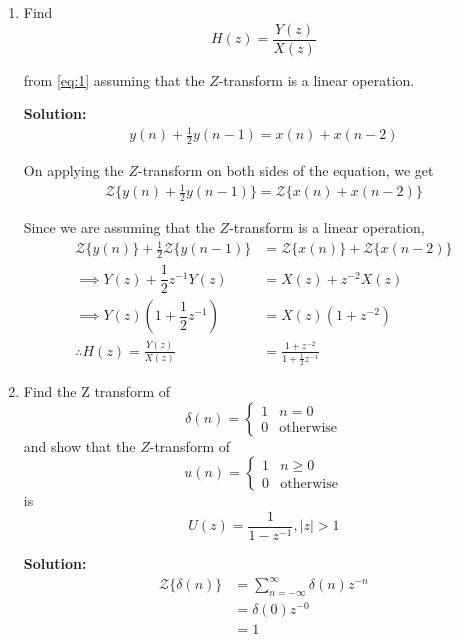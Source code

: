 \documentclass[journal,12pt,twocolumn]{IEEEtran}
\newcommand{\solution}{\noindent \textbf{Solution: }}
\providecommand{\brak}[1]{\ensuremath{\left(#1\right)}}
\providecommand{\abs}[1]{\left\vert#1\right\vert}
\providecommand{\z}[1]{{\mathcal{Z}}\{#1\}}
\numberwithin{equation}{section}
\renewcommand\thesection{\arabic{section}}
\begin{document}
\begin{enumerate}[label=\thesection.\arabic*]
	\item Find
	\begin{equation}
		H(z) = \frac{Y(z)}{X(z)}
	\end{equation}

	from  \eqref{eq:1} assuming that the $Z$-transform is a linear operation.

	\solution 
	\begin{align}
		y(n) + \frac{1}{2}y(n-1) = x(n) + x(n-2)
	\end{align}
	
	On applying the $Z$-transform on both sides of the equation, we get
	\begin{align}
		\z{y\brak{n} + \frac{1}{2}y\brak{n-1}} = \z{x\brak{n} + x\brak{n-2}}
	\end{align}
	
	Since we are assuming that the $Z$-transform is a linear operation,
	\begin{align}
		\z{y(n)} + \frac12 \z{y(n-1)} &= \z{x(n)} + \z{x(n-2)} \\
		\implies Y(z) + \dfrac{1}{2} z^{-1} Y(z) &= X(z) + z^{-2} X(z) \\
		\implies Y(z) \brak{1 + \dfrac{1}{2} z^{-1}} &= X(z) (1 + z^{-2}) \\
		\therefore H(z) = \frac{Y(z)}{X(z)} &= \frac{1 + z^{-2}}{1 + \frac12 z^{-1}}
	\end{align}
	
	\item Find the Z transform of 
	\begin{equation}
		\delta(n) =
		\begin{cases}
			1 & n = 0 \\
			0 & \text{otherwise}
		\end{cases}
	\end{equation}
	and show that the $Z$-transform of
	\begin{equation}
	\label{eq:unit_step}
	u\brak{n} =
	\begin{cases}
		1 & n \ge 0 \\
		0 & \text{otherwise}	
	\end{cases}
	\end{equation}
	is
	\begin{equation}
		U(z) = \frac{1}{1-z^{-1}}, \abs{z} > 1
	\end{equation}
	
	\solution 
	\begin{align}
		\z{\delta(n)} &= \sum _{n=-\infty }^{\infty }\delta(n)z^{-n} \\
		&= \delta(0) z^{-0} \\
		&= 1 
	\end{align}
	

\end{enumerate}
\end{document}

